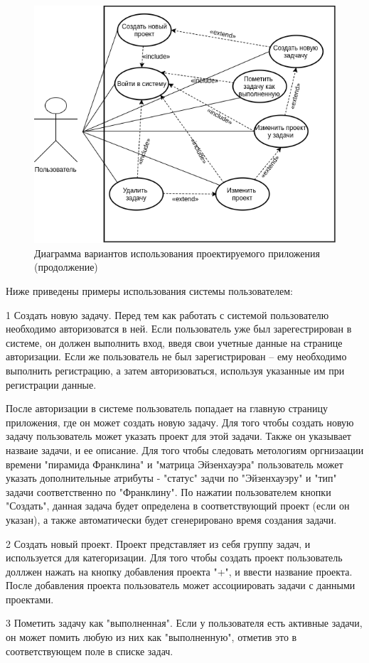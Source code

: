 \begin{figure}[th]
\centering
  \includegraphics[scale=0.5]{images/diagrams/use-case/3.png} 
  \caption{ Диаграмма вариантов использования проектируемого приложения (продолжение) }
  \label{fig:domain:todist}
\end{figure}

Ниже приведены примеры использования системы пользователем:

1 Создать новую задачу. Перед тем как работать с системой пользователю необходимо авторизоватся в ней. Если пользователь уже был зарегестрирован в системе, он должен выполнить вход, введя свои учетные данные на странице авторизации. Если же пользователь не был зарегистрирован – ему необходимо выполнить регистрацию, а затем авторизоваться, используя указанные им при регистрации данные.

После авторизации в системе пользователь попадает на главную страницу приложения, где он может создать новую задачу. Для того чтобы создать новую задачу пользователь может указать проект для этой задачи. Также он указывает назваие задачи, и ее описание. Для того чтобы следовать метологиям оргнизаации времени "пирамида Франклина" и "матрица Эйзенхауэра" пользователь может указать дополнительные атрибуты - "статус" задчи по "Эйзенхауэру" и "тип" задачи соответственно по "Франклину". По нажатии пользователем кнопки "Создать", данная задача будет определена в соответствующий проект (если он указан), а также автоматически будет сгенерировано время создания задачи.

2 Создать новый проект. Проект представляет из себя группу задач, и используется для категоризации. Для того чтобы создать проект пользователь доллжен нажать на кнопку добавления проекта "+", и ввести название проекта. После добавления проекта пользователь может ассоциировать задачи с данными проектами. 

3 Пометить задачу как "выполненная". Если у пользователя есть активные задачи, он может помить любую из них как "выполненную", отметив это в соответствующем поле в списке задач.